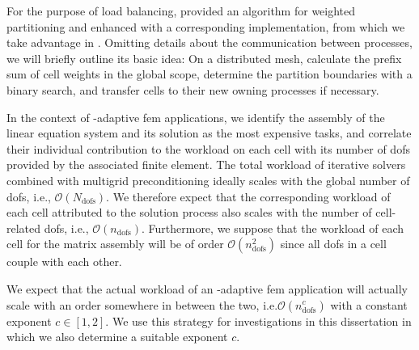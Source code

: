 
For the purpose of load balancing, \textcite[Sec.~3.3]{burstedde2011} provided an algorithm for weighted partitioning and enhanced \pforest{} \textcite{p4est22} with a corresponding implementation, from which we take advantage in \dealii{}. Omitting details about the communication between processes, we will briefly outline its basic idea: On a distributed mesh, calculate the prefix sum of cell weights in the global scope, determine the partition boundaries with a binary search, and transfer cells to their new owning processes if necessary.




In the context of \hp-adaptive \gls{fem} applications, we identify the assembly of the linear equation system and its solution as the most expensive tasks, and correlate their individual contribution to the workload on each cell with its number of \glspl{dof} provided by the associated finite element.
The total workload of iterative solvers combined with multigrid preconditioning ideally scales with the global number of \glspl{dof}, i.e., $\mathcal{O}\left(N_\text{dofs}\right)$. We therefore expect that the corresponding workload of each cell attributed to the solution process also scales with the number of cell-related \glspl{dof}, i.e., $\mathcal{O}\left(n_\text{dofs}\right)$. Furthermore, we suppose that the workload of each cell for the matrix assembly will be of order $\mathcal{O}\left(n_\text{dofs}^2\right)$ since all \glspl{dof} in a cell couple with each other.

We expect that the actual workload of an \hp-adaptive \gls{fem} application will actually scale with an order somewhere in between the two, i.e.\@ $\mathcal{O}\left(n_\text{dofs}^c\right)$ with a constant exponent $c \in [1,2]$. We use this strategy for investigations in this dissertation in which we also determine a suitable exponent $c$.

